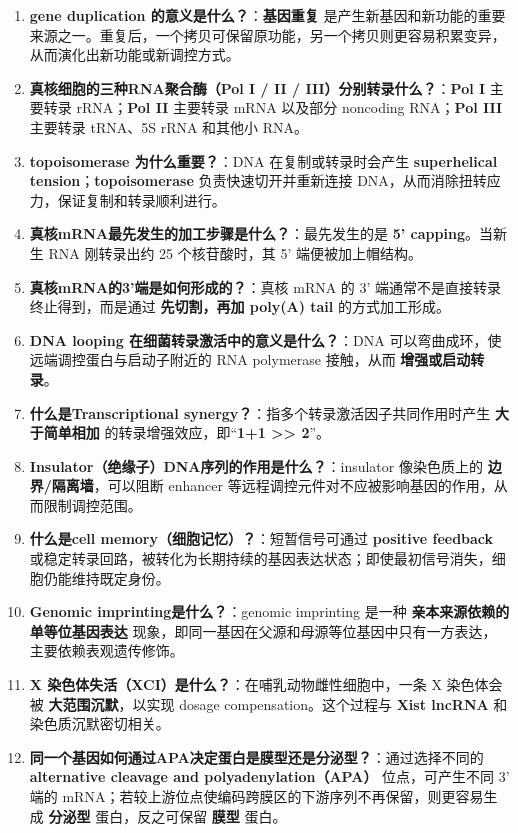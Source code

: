 \documentclass[12pt,fontset=none]{ctexart}
\begin{document}
\begin{enumerate}
\item \textbf{gene duplication 的意义是什么？}：\textbf{基因重复} 是产生新基因和新功能的重要来源之一。重复后，一个拷贝可保留原功能，另一个拷贝则更容易积累变异，从而演化出新功能或新调控方式。

\item \textbf{真核细胞的三种RNA聚合酶（Pol I / II / III）分别转录什么？}：\textbf{Pol I} 主要转录 rRNA；\textbf{Pol II} 主要转录 mRNA 以及部分 noncoding RNA；\textbf{Pol III} 主要转录 tRNA、5S rRNA 和其他小 RNA。

\item \textbf{topoisomerase 为什么重要？}：DNA 在复制或转录时会产生 \textbf{superhelical tension}；\textbf{topoisomerase} 负责快速切开并重新连接 DNA，从而消除扭转应力，保证复制和转录顺利进行。

\item \textbf{真核mRNA最先发生的加工步骤是什么？}：最先发生的是 \textbf{5' capping}。当新生 RNA 刚转录出约 25 个核苷酸时，其 5' 端便被加上帽结构。

\item \textbf{真核mRNA的3'端是如何形成的？}：真核 mRNA 的 3' 端通常不是直接转录终止得到，而是通过 \textbf{先切割，再加 poly(A) tail} 的方式加工形成。

\item \textbf{DNA looping 在细菌转录激活中的意义是什么？}：DNA 可以弯曲成环，使远端调控蛋白与启动子附近的 RNA polymerase 接触，从而 \textbf{增强或启动转录}。

\item \textbf{什么是Transcriptional synergy？}：指多个转录激活因子共同作用时产生 \textbf{大于简单相加} 的转录增强效应，即“\textbf{1+1 >> 2}”。

\item \textbf{Insulator（绝缘子）DNA序列的作用是什么？}：insulator 像染色质上的 \textbf{边界/隔离墙}，可以阻断 enhancer 等远程调控元件对不应被影响基因的作用，从而限制调控范围。

\item \textbf{什么是cell memory（细胞记忆）？}：短暂信号可通过 \textbf{positive feedback} 或稳定转录回路，被转化为长期持续的基因表达状态；即使最初信号消失，细胞仍能维持既定身份。

\item \textbf{Genomic imprinting是什么？}：genomic imprinting 是一种 \textbf{亲本来源依赖的单等位基因表达} 现象，即同一基因在父源和母源等位基因中只有一方表达，主要依赖表观遗传修饰。

\item \textbf{X 染色体失活（XCI）是什么？}：在哺乳动物雌性细胞中，一条 X 染色体会被 \textbf{大范围沉默}，以实现 dosage compensation。这个过程与 \textbf{Xist lncRNA} 和染色质沉默密切相关。

\item \textbf{同一个基因如何通过APA决定蛋白是膜型还是分泌型？}：通过选择不同的 \textbf{alternative cleavage and polyadenylation（APA）} 位点，可产生不同 3' 端的 mRNA；若较上游位点使编码跨膜区的下游序列不再保留，则更容易生成 \textbf{分泌型} 蛋白，反之可保留 \textbf{膜型} 蛋白。

\end{enumerate}
\end{document}
